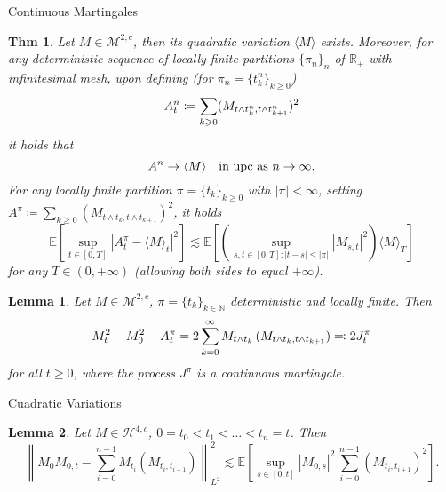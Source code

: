 \documentclass[a4paper]{article}
\theoremstyle{mytheoremstyle}
\newtheorem{theorem}{Thm}
\newtheorem{lemma}{Lemma}
\newcommand{\1}{\mathds{1}}
\begin{document}
\begin{multicols*}{3}
\begin{roundbox}{Continuous Martingales}
\begin{theorem}
  \label{thm:quadratic.variation.existence}Let $M \in \mathcal{M}^{2, c}$,
  then its quadratic variation $\langle M \rangle$ exists. Moreover, for any
  deterministic sequence of locally finite partitions $\{ \pi_n \}_n$ of
  $\mathbb{R}_+$ with infinitesimal mesh, upon defining (for $\pi_n = \{ t^n_k
  \}_{k \geqslant 0}$)
  \vspace{-0.5em}
  \[
    A^n_t \coloneq \sum_{k \geqslant 0} (M_{t \wedge t^n_k, t \wedge t^n_{k +
     1}})^2
  \vspace{-1em}
  \]
  it holds that
  \vspace{-0.5em}
  \begin{equation}
    A^n \rightarrow \langle M \rangle \quad \text{in upc as } n \rightarrow
    \infty. \label{eq:existence.qv.upc}
  \vspace{-0.5em}
  \end{equation}
  For any locally finite partition $\pi = \{ t_k \}_{k \geqslant 0}$ with $|
  \pi | < \infty$, setting $A^{\pi} \coloneq \sum_{k \geqslant 0} (M_{t \wedge
  t_k, t \wedge t_{k + 1}})^2$, it holds
  {
  \small
  \begin{equation*}
    \mathbb{E} \left[\sup_{t \in [0, T]} | A^{\pi}_t - \langle M \rangle_t |^2 \right]
    \lesssim \mathbb{E} \left[ \left(\sup_{s, t \in [0, T] : | t - s | \leqslant | \pi |}
    | M_{s, t} |^2 \right) \langle M \rangle_T \right] \label{eq:existence.qv.main.estim}
  \end{equation*}
  }
  for any $T \in (0, + \infty)$ (allowing both sides to equal $+ \infty$).
\end{theorem}

\begin{lemma}
  \label{lem:quadratic.existence.lemma1}Let $M \in \mathcal{M}^{2, c}$, $\pi =
  \{ t_k \}_{k \in \mathbb{N}}$ deterministic and locally finite. Then
  \vspace{-1em}
  \begin{equation}
    M^2_t - M^2_0 - A^{\pi}_t = 2 \sum_{k = 0}^{\infty} M_{t \wedge t_k} \,
    (M_{t \wedge t_k, t \wedge t_{k + 1}}) \eqqcolon 2 J^{\pi}_t
    \label{eq:quadratic.existence.lemma1}
  \vspace{-0.5em}
  \end{equation}
  for all $t \geqslant 0$, where the process $J^{\pi}$ is a continuous
  martingale.
\end{lemma}
\end{roundbox}

\begin{roundbox}{Cuadratic Variations}
\begin{lemma}
  \label{lem:quadratic.existence.lemma2}Let $M \in \mathcal{H}^{4, c}$, $0 =
  t_0 < t_1 < \ldots < t_n = t$. Then
  {
    \footnotesize
  \[
    \left\| M_0 M_{0, t} - \sum_{i = 0}^{n - 1} M_{t_i} (M_{t_i, t_{i + 1}})
     \right\|_{L^2}^2 \lesssim \mathbb{E} \left[ \sup_{s \in [0, t]} | M_{0,
     s} |^2 \, \sum_{i = 0}^{n - 1} (M_{t_i, t_{i + 1}})^2 \right] .
   \]
 }
\end{lemma}


\end{roundbox}
\end{multicols*}
\end{document}
